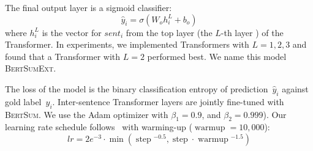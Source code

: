 \documentclass[11pt,a4paper]{article}
\DeclareMathOperator\step{\operatorname{step}}
\DeclareMathOperator\warmup{\operatorname{warmup}}
\begin{document}
    The final output layer is a sigmoid classifier:
    \begin{equation}
    \hat{y}_i = \sigma(W_oh_i^L+b_o)
    \end{equation}
    where $h^L_i$ is the vector for $sent_i$ from the top layer (the
    $L$-th layer ) of the Transformer. In experiments, we implemented
    Transformers with $L=1, 2, 3$ and found that a Transformer with
    $L=2$ performed best.
    We name this model \textsc{BertSumExt}.
    
The loss of the model is the binary classification entropy of
    prediction~$\hat{y}_i$ against gold label~$y_i$.  Inter-sentence
    Transformer layers are jointly fine-tuned with \textsc{BertSum}.
    We use the Adam optimizer with $\beta_1=0.9$, and
    $\beta_2=0.999$). Our learning rate schedule
    follows~\cite{vaswani2017attention} with warming-up ($ \warmup=10,000$):
    \begin{equation}
    \nonumber lr = 2e^{-3}\cdot \min{}(\step{}^{-0.5}, \step{} \cdot \warmup{}^{-1.5})
    \end{equation}
    
    
    
\end{document}
